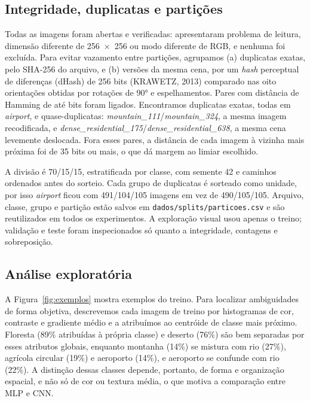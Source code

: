 \documentclass[12pt,a4paper]{article}
\begin{document}
\subsection{Integridade, duplicatas e partições}

Todas as imagens foram abertas e verificadas:  apresentaram problema de leitura, dimensão diferente de 256~×~256 ou modo diferente de RGB, e nenhuma foi excluída. Para evitar vazamento entre partições, agrupamos (a) duplicatas exatas, pelo SHA-256 do arquivo, e (b) versões da mesma cena, por um \textit{hash} perceptual de diferenças (dHash) de 256 bits (KRAWETZ, 2013) comparado nas oito orientações obtidas por rotações de 90° e espelhamentos. Pares com distância de Hamming de até  bits foram ligados. Encontramos  duplicatas exatas, todas em \textit{airport}, e  quase-duplicatas: \textit{mountain\_111}/\textit{mountain\_324}, a mesma imagem recodificada, e \textit{dense\_residential\_175}/\textit{dense\_residential\_638}, a mesma cena levemente deslocada. Fora esses pares, a distância de cada imagem à vizinha mais próxima foi de 35 bits ou mais, o que dá margem ao limiar escolhido.

A divisão é 70/15/15, estratificada por classe, com semente 42 e caminhos ordenados antes do sorteio. Cada grupo de duplicatas é sorteado como unidade, por isso \textit{airport} ficou com 491/104/105 imagens em vez de 490/105/105. Arquivo, classe, grupo e partição estão salvos em \nolinkurl{dados/splits/particoes.csv} e são reutilizados em todos os experimentos. A exploração visual usou apenas o treino; validação e teste foram inspecionados só quanto a integridade, contagens e sobreposição.

\subsection{Análise exploratória}

A Figura~\ref{fig:exemplos} mostra exemplos do treino. Para localizar ambiguidades de forma objetiva, descrevemos cada imagem de treino por histogramas de cor, contraste e gradiente médio e a atribuímos ao centróide de classe mais próximo. Floresta (89\% atribuídas à própria classe) e deserto (76\%) são bem separadas por esses atributos globais, enquanto montanha (14\%) se mistura com rio (27\%), agrícola circular (19\%) e aeroporto (14\%), e aeroporto se confunde com rio (22\%). A distinção dessas classes depende, portanto, de forma e organização espacial, e não só de cor ou textura média, o que motiva a comparação entre MLP e CNN.
\end{document}
